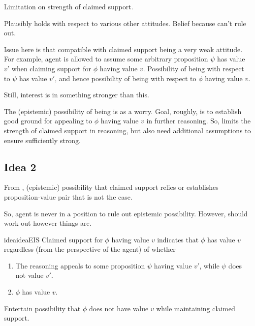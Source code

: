 \begin{note}
  Limitation on strength of claimed support.

  Plausibly holds with respect to various other attitudes.
  Belief because can't rule out.

  Issue here is that compatible with claimed support being a very weak attitude.
  For example, agent is allowed to assume some arbitrary proposition \(\psi\) has value \(v'\) when claiming support for \(\phi\) having value \(v\).
  Possibility of being \mistaken{} with respect to \(\psi\) has value \(v'\), and hence possibility of being \misled{} with respect to \(\phi\) having value \(v\).

  Still, interest is in something stronger than this.

  The (epistemic) possibility of being \mom{} is as a worry.
  Goal, roughly, is to establish good ground for appealing to \(\phi\) having value \(v\) in further reasoning.
  So, \ideaCSA{} limits the strength of claimed support in reasoning, but also need additional assumptions to ensure sufficiently strong.
\end{note}

\subsection{Idea 2}
\label{sec:idea-2}

\begin{note}[]
  From \ideaCSA{}, (epistemic) possibility that claimed support relies or establishes proposition-value pair that is not the case.

  So, agent is never in a position to rule out epistemic possibility.
  However, should work out however things are.

  \begin{restatable}[\ideaCSB{-} --- \ideaCSB{}]{idea}{ideaEIS}
    \label{idea:eiS}
    Claimed support for \(\phi\) having value \(v\) indicates that \(\phi\) has value \(v\) regardless (from the perspective of the agent) of whether
    \begin{enumerate}
    \item The reasoning appeals to some proposition \(\psi\) having value \(v'\), while \(\psi\) does not value \(v'\).
    \item \(\phi\) has value \(v\).
    \end{enumerate}
  \end{restatable}
  Entertain possibility that \(\phi\) does not have value \(v\) while maintaining claimed support.
\end{note}

